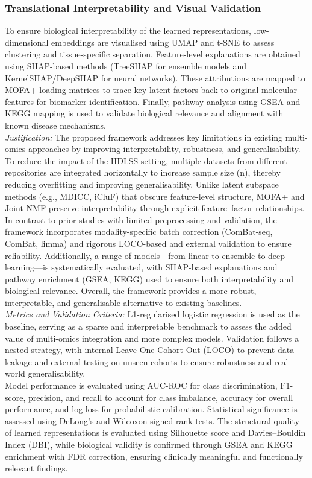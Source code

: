 \documentclass[conference]{IEEEtran}
\begin{document}
\subsubsection{Translational Interpretability and Visual Validation} To ensure biological interpretability of the learned representations, low-dimensional embeddings are visualised using UMAP and t-SNE to assess clustering and tissue-specific separation. Feature-level explanations are obtained using SHAP-based methods (TreeSHAP for ensemble models and KernelSHAP/DeepSHAP for neural networks). These attributions are mapped to MOFA+ loading matrices to trace key latent factors back to original molecular features for biomarker identification. Finally, pathway analysis using GSEA and KEGG mapping is used to validate biological relevance and alignment with known disease mechanisms.
\\
\textit{Justification:} The proposed framework addresses key limitations in existing multi-omics approaches by improving interpretability, robustness, and generalisability. To reduce the impact of the HDLSS setting, multiple datasets from different repositories are integrated horizontally to increase sample size (n), thereby reducing overfitting and improving generalisability. Unlike latent subspace methods (e.g., MDICC, iCluF) that obscure feature-level structure, MOFA+ and Joint NMF preserve interpretability through explicit feature–factor relationships.
\\
In contrast to prior studies with limited preprocessing and validation, the framework incorporates modality-specific batch correction (ComBat-seq, ComBat, limma) and rigorous LOCO-based and external validation to ensure reliability. Additionally, a range of models—from linear to ensemble to deep learning—is systematically evaluated, with SHAP-based explanations and pathway enrichment (GSEA, KEGG) used to ensure both interpretability and biological relevance. Overall, the framework provides a more robust, interpretable, and generalisable alternative to existing baselines.\\
\textit{Metrics and Validation Criteria:} L1-regularised logistic regression is used as the baseline, serving as a sparse and interpretable benchmark to assess the added value of multi-omics integration and more complex models. Validation follows a nested strategy, with internal Leave-One-Cohort-Out (LOCO) to prevent data leakage and external testing on unseen cohorts to ensure robustness and real-world generalisability.\\
Model performance is evaluated using AUC-ROC for class discrimination, F1-score, precision, and recall to account for class imbalance, accuracy for overall performance, and log-loss for probabilistic calibration. Statistical significance is assessed using DeLong’s and Wilcoxon signed-rank tests. The structural quality of learned representations is evaluated using Silhouette score and Davies–Bouldin Index (DBI), while biological validity is confirmed through GSEA and KEGG enrichment with FDR correction, ensuring clinically meaningful and functionally relevant findings.
\end{document}
